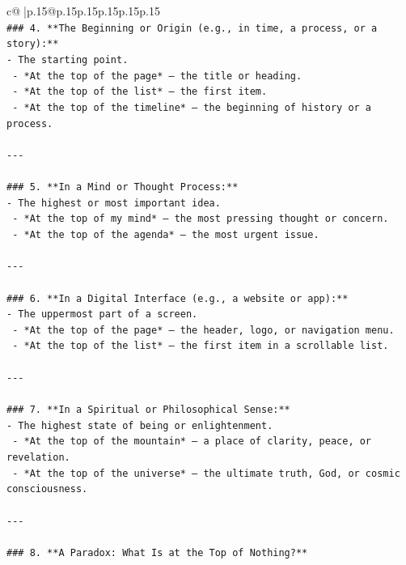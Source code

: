 \documentclass{article}
\begin{document}
{\begin{supertabular}{c@{$\;$}|p{.15\linewidth}@{}p{.15\linewidth}p{.15\linewidth}p{.15\linewidth}p{.15\linewidth}p{.15\linewidth}}
{{{\\ 
\texttt{\#\#\# 4. **The Beginning or Origin (e.g., in time, a process, or a story):**} \\
\texttt{{-} The starting point.} \\
\texttt{  {-} *At the top of the page* — the title or heading.} \\
\texttt{  {-} *At the top of the list* — the first item.} \\
\texttt{  {-} *At the top of the timeline* — the beginning of history or a process.} \\
\\ 
\texttt{{-}{-}{-}} \\
\\ 
\texttt{\#\#\# 5. **In a Mind or Thought Process:**} \\
\texttt{{-} The highest or most important idea.} \\
\texttt{  {-} *At the top of my mind* — the most pressing thought or concern.} \\
\texttt{  {-} *At the top of the agenda* — the most urgent issue.} \\
\\ 
\texttt{{-}{-}{-}} \\
\\ 
\texttt{\#\#\# 6. **In a Digital Interface (e.g., a website or app):**} \\
\texttt{{-} The uppermost part of a screen.} \\
\texttt{  {-} *At the top of the page* — the header, logo, or navigation menu.} \\
\texttt{  {-} *At the top of the list* — the first item in a scrollable list.} \\
\\ 
\texttt{{-}{-}{-}} \\
\\ 
\texttt{\#\#\# 7. **In a Spiritual or Philosophical Sense:**} \\
\texttt{{-} The highest state of being or enlightenment.} \\
\texttt{  {-} *At the top of the mountain* — a place of clarity, peace, or revelation.} \\
\texttt{  {-} *At the top of the universe* — the ultimate truth, God, or cosmic consciousness.} \\
\\ 
\texttt{{-}{-}{-}} \\
\\ 
\texttt{\#\#\# 8. **A Paradox: What Is at the Top of Nothing?**} \\
}}}
\end{supertabular}}
\end{document}
